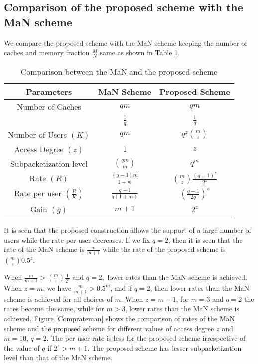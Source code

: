 \documentclass[conference]{IEEEtran}
\begin{document}
\subsection{Comparison of the proposed scheme with the MaN scheme}
	\label{CompMaN}
	We compare the proposed scheme with the MaN scheme keeping the number of caches and memory fraction $\frac{M}{N}$ same as shown in  Table \ref{compwithMaN}.   
\begin{table}[]
		\caption{Comparison between the MaN\cite{MaN} and the proposed scheme}
		\begin{center}
			\renewcommand{\arraystretch}{2}
			\begin{tabular}{|c|c|c|}
				\hline
				\textbf{Parameters} &\textbf{MaN Scheme}  &  \textbf{Proposed Scheme}\\\hline\hline
				Number of Caches & $qm$ &  $qm$\\\hline
				\makecell{File fraction $\left(\frac{M}{N}\right)$} & $\frac{1}{q}$ &  $\frac{1}{q}$\\\hline
				Number of Users $(K)$ & $qm$   &$q^z{{m}\choose{z}}$\\\hline
				Access Degree $(z)$ &  $1$ & $z$ \\\hline
				Subpacketization level  & $\binom{qm}{m}$ & $q^m$\\[.2cm]\hline
				Rate $(R)$  & $\frac{(q-1)m}{1+m}$ & $ {{m}\choose{z}} \frac{{(q - 1)}^z}{{2}^z}$\\[.2cm]\hline
				Rate per user $\left(\frac{R}{K}\right)$  & $\frac{q-1}{q(1+m)}$ & $({\frac{q-1}{2q}})^z$\\[.2cm]\hline
				Gain $(g)$ & ${m + 1}$  & $2^z$\\\hline
			\end{tabular}
		\end{center}
\label{compwithMaN}
\end{table}
	It is seen that the proposed construction allows the support of a large number of users while the rate per user decreases. If we fix $q = 2$, then it is seen that the rate of the MaN scheme is $\frac{m}{m+1}$ while the rate of the proposed scheme is $\binom{m}{z}0.5^z$.
	
	When $\frac{m}{m+1} > \binom{m}{z} \frac{1}{2^z}$ and $q = 2,$  lower rates than the MaN scheme is achieved. When $z = m$, we have $\frac{m}{m+1} > 0.5^m$, and if $q = 2$, then lower rates than the MaN scheme is achieved for all choices of $m$. When $z = m-1$, for $m = 3$ and $q = 2$ the rates become the same, while for $m > 3$, lower rates than the MaN scheme is achieved. 
	Figure \ref{Comprateman} shows the comparison of rates of the MaN scheme and the proposed scheme for different values of access degree $z$ and $m = 10$, $q = 2$. The per user rate is less for the proposed scheme irrespective of the value of $q$ if $2^z > m + 1$. The proposed scheme has lesser subpacketization level than that of the MaN scheme.
\end{document}
